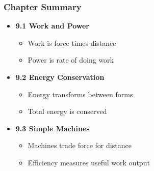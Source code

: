 \documentclass{beamer}
\begin{document}
\begin{frame}
\frametitle{Chapter Summary}
\begin{itemize}
\item \textbf{9.1 Work and Power}
  \begin{itemize}
  \item Work is force times distance
  \item Power is rate of doing work
  \end{itemize}
\item \textbf{9.2 Energy Conservation}
  \begin{itemize}
  \item Energy transforms between forms
  \item Total energy is conserved
  \end{itemize}
\item \textbf{9.3 Simple Machines}
  \begin{itemize}
  \item Machines trade force for distance
  \item Efficiency measures useful work output
  \end{itemize}
\end{itemize}
\end{frame}
\end{document}
